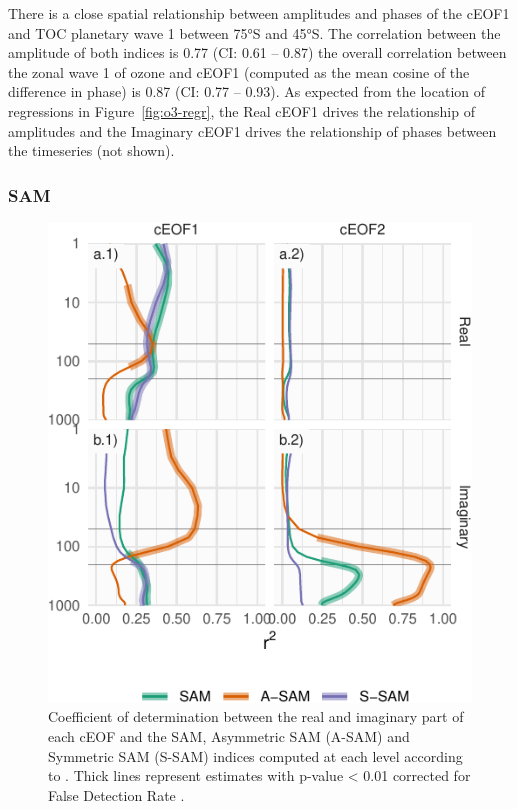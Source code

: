 \documentclass[smallextended]{svjour3}       %
\begin{document}
There is a close spatial relationship between amplitudes and phases of the cEOF1 and TOC planetary wave 1 between 75°S and 45°S.
The correlation between the amplitude of both indices is 0.77 (CI: 0.61 -- 0.87) the overall correlation between the zonal wave 1 of ozone and cEOF1 (computed as the mean cosine of the difference in phase) is 0.87 (CI: 0.77 -- 0.93).
As expected from the location of regressions in Figure~\ref{fig:o3-regr}, the Real cEOF1 drives the relationship of amplitudes and the Imaginary cEOF1 drives the relationship of phases between the timeseries (not shown).

\hypertarget{sam}{%
\subsubsection{SAM}\label{sam}}



\begin{figure}
\centering
\includegraphics{../figures/sam-eof-vertical-1.pdf}
\caption{\label{fig:sam-eof-vertical}Coefficient of determination between the real and imaginary part of each cEOF and the SAM, Asymmetric SAM (A-SAM) and Symmetric SAM (S-SAM) indices computed at each level according to \citet{campitelli2021}. Thick lines represent estimates with p-value \textless{} 0.01 corrected for False Detection Rate \citep{benjamini1995}.}
\end{figure}
\end{document}
